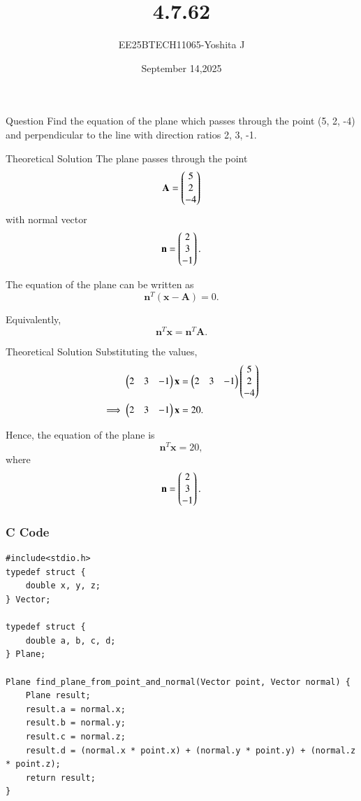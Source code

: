 \documentclass{beamer}
\begin{document}
\title 
{4.7.62}
\date{September 14,2025}


\author 
{EE25BTECH11065-Yoshita J}






\frame{\titlepage}
\begin{frame}{Question}
Find the equation of the plane which passes through the point (5, 2, -4) and perpendicular to the line with direction ratios 2, 3, -1.\\

\end{frame}


\begin{frame}{Theoretical Solution}
The plane passes through the point
\[
\mathbf{A} = \begin{pmatrix}5\\2\\-4\end{pmatrix}
\]
with normal vector
\[
\mathbf{n} = \begin{pmatrix}2\\3\\-1\end{pmatrix}.
\]

The equation of the plane can be written as
\[
\mathbf{n}^T(\mathbf{x}-\mathbf{A})=0.
\]

Equivalently,
\[
\mathbf{n}^T\mathbf{x}=\mathbf{n}^T\mathbf{A}.
\]
\end{frame}

\begin{frame}{Theoretical Solution}
Substituting the values,
\begin{align}
\begin{pmatrix}2 & 3 & -1\end{pmatrix}\mathbf{x} &= \begin{pmatrix}2 & 3 & -1\end{pmatrix}\begin{pmatrix}5\\2\\-4\end{pmatrix} \\
\implies \begin{pmatrix}2 & 3 & -1\end{pmatrix}\mathbf{x} &= 20.
\end{align}

Hence, the equation of the plane is
\[
\mathbf{n}^T\mathbf{x} = 20,
\]
where
\[
\mathbf{n} = \begin{pmatrix}2\\3\\-1\end{pmatrix}.
\]

\end{frame}

\begin{frame}[fragile]
    \frametitle{C Code}

    \begin{lstlisting}
#include<stdio.h>
typedef struct {
    double x, y, z;
} Vector;

typedef struct {
    double a, b, c, d;
} Plane;

Plane find_plane_from_point_and_normal(Vector point, Vector normal) {
    Plane result;
    result.a = normal.x;
    result.b = normal.y;
    result.c = normal.z;
    result.d = (normal.x * point.x) + (normal.y * point.y) + (normal.z * point.z);
    return result;
}
    \end{lstlisting}
\end{frame}
\end{document}
